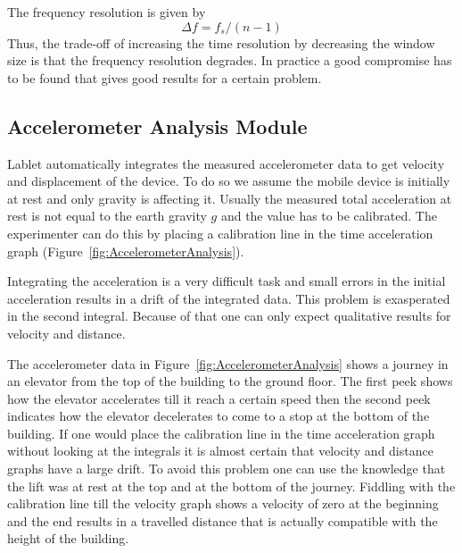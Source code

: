 \documentclass{sigchi}
\begin{document}
The frequency resolution is given by
\[
\Delta f = f_s / (n - 1)
\]
Thus, the trade-off of increasing the time resolution by decreasing
the window size is that the frequency resolution degrades.  In
practice a good compromise has to be found that gives good results for
a certain problem.

\subsection{Accelerometer Analysis Module}
Lablet automatically integrates the measured accelerometer data to get
velocity and displacement of the device.  To do so we assume the
mobile device is initially at rest and only gravity is affecting it.
Usually the measured total acceleration at rest is not equal to the
earth gravity $g$ and the value has to be calibrated.  The
experimenter can do this by placing a calibration line in the time
acceleration graph (Figure~\ref{fig:AccelerometerAnalysis}).

Integrating the acceleration is a very difficult task and small errors
in the initial acceleration results in a drift of the integrated data.
This problem is exasperated in the second integral.  Because of that
one can only expect qualitative results for velocity and distance.

The accelerometer data in Figure~\ref{fig:AccelerometerAnalysis} shows
a journey in an elevator from the top of the building to the ground
floor.  The first peek shows how the elevator accelerates till it
reach a certain speed then the second peek indicates how the elevator
decelerates to come to a stop at the bottom of the building.  If one
would place the calibration line in the time acceleration graph
without looking at the integrals it is almost certain that velocity
and distance graphs have a large drift.  To avoid this problem one can
use the knowledge that the lift was at rest at the top and at the
bottom of the journey.  Fiddling with the calibration line till the
velocity graph shows a velocity of zero at the beginning and the end
results in a travelled distance that is actually compatible with the
height of the building.
\end{document}

